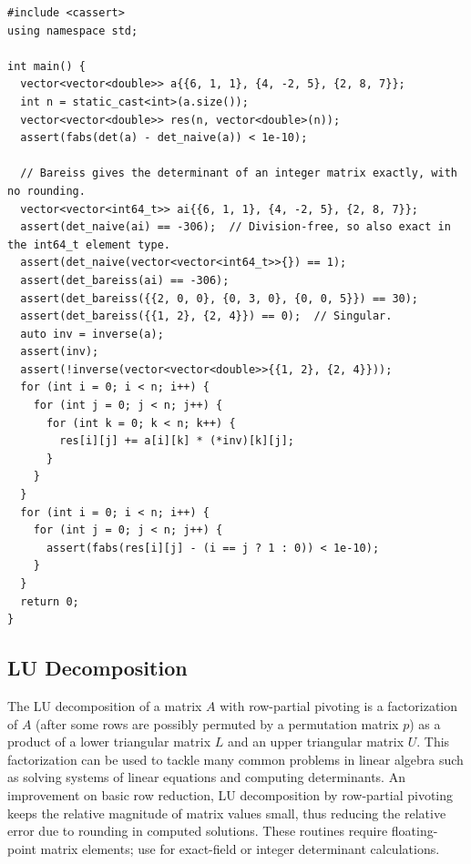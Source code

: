 \begin{lstlisting}[style=cpp]
#include <cassert>
using namespace std;

int main() {
  vector<vector<double>> a{{6, 1, 1}, {4, -2, 5}, {2, 8, 7}};
  int n = static_cast<int>(a.size());
  vector<vector<double>> res(n, vector<double>(n));
  assert(fabs(det(a) - det_naive(a)) < 1e-10);

  // Bareiss gives the determinant of an integer matrix exactly, with no rounding.
  vector<vector<int64_t>> ai{{6, 1, 1}, {4, -2, 5}, {2, 8, 7}};
  assert(det_naive(ai) == -306);  // Division-free, so also exact in the int64_t element type.
  assert(det_naive(vector<vector<int64_t>>{}) == 1);
  assert(det_bareiss(ai) == -306);
  assert(det_bareiss({{2, 0, 0}, {0, 3, 0}, {0, 0, 5}}) == 30);
  assert(det_bareiss({{1, 2}, {2, 4}}) == 0);  // Singular.
  auto inv = inverse(a);
  assert(inv);
  assert(!inverse(vector<vector<double>>{{1, 2}, {2, 4}}));
  for (int i = 0; i < n; i++) {
    for (int j = 0; j < n; j++) {
      for (int k = 0; k < n; k++) {
        res[i][j] += a[i][k] * (*inv)[k][j];
      }
    }
  }
  for (int i = 0; i < n; i++) {
    for (int j = 0; j < n; j++) {
      assert(fabs(res[i][j] - (i == j ? 1 : 0)) < 1e-10);
    }
  }
  return 0;
}
\end{lstlisting}
\subsection{LU Decomposition}
\label{sec:6.5.4}
The LU decomposition of a matrix $A$ with row-partial pivoting is a factorization of $A$ (after some rows are possibly permuted by a permutation matrix $p$) as a product of a lower triangular matrix $L$ and an upper triangular matrix $U$. This factorization can be used to tackle many common problems in linear algebra such as solving systems of linear equations and computing determinants. An improvement on basic row reduction, LU decomposition by row-partial pivoting keeps the relative magnitude of matrix values small, thus reducing the relative error due to rounding in computed solutions. These routines require floating-point matrix elements; use  for exact-field or integer determinant calculations.

